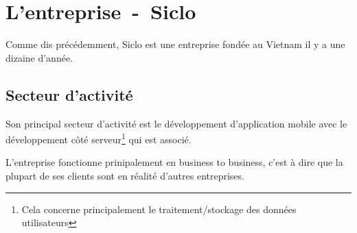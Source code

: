 \documentclass[../main.tex]{subfiles}
\begin{document}
    \chapter{L'entreprise~-~Siclo}
        Comme dis précédemment, Siclo est une entreprise fondée au Vietnam il y a une dizaine d'année.
        \section{Secteur d'activité}
        Son principal secteur d'activité est le développement d'application mobile avec le développement côté serveur\footnote{Cela concerne principalement le traitement/stockage des données utilisateurs} qui est associé.

        L'entreprise fonctionne prinipalement en business to business, c'est à dire que la plupart de ses clients sont en réalité d'autres entreprises.
\end{document}
